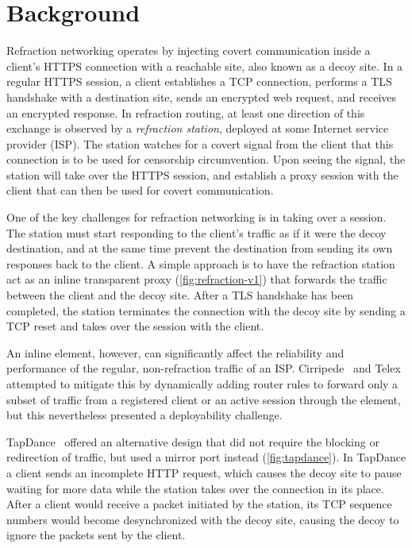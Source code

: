 \section{Background}

Refraction networking operates by injecting covert communication inside a
client's HTTPS connection with a reachable site, also known as a decoy site. In
a regular HTTPS session, a client establishes a TCP connection, performs a TLS
handshake with a destination site, sends an encrypted web request, and
receives an encrypted response. In refraction routing, at least one direction
of this exchange is observed by a \emph{refraction station}, deployed at
some Internet service provider (ISP). The station watches for a covert signal from
the client that this connection is to be used for censorship circumvention.
Upon seeing the signal, the station will take over the HTTPS session,
and establish a proxy session with the client that can then be used for covert
communication.

\FigEvolution

One of the key challenges for refraction networking is in taking over a session. The station must start responding to the client's traffic as if it were the decoy destination, and at the same time prevent the destination from sending its own responses back to the client. A simple approach is to have the refraction station act as an inline transparent proxy (\cref{fig:refraction-v1}) that forwards the traffic between the client and the decoy site. After a TLS handshake has been completed, the station terminates the connection with the decoy site by sending a TCP reset and takes over the session with the client.

An inline element, however, can significantly affect the reliability and performance of the regular, non-refraction traffic of an ISP. Cirripede~\cite{cirripede11} and Telex~\cite{telex11} attempted to mitigate this by dynamically adding router rules to forward only a subset of traffic from a registered client or an active session through the element, but this nevertheless presented a deployability challenge.

TapDance~\cite{tapdance14} offered an alternative design that did not require the blocking or redirection of traffic, but used a mirror port instead (\cref{fig:tapdance}). In TapDance a client sends an incomplete HTTP request, which causes the decoy site to pause waiting for more data while the station takes over the connection in its place. After a client would receive a packet initiated by the station, its TCP sequence numbers would become desynchronized with the decoy site, causing the decoy to ignore the packets sent by the client.

